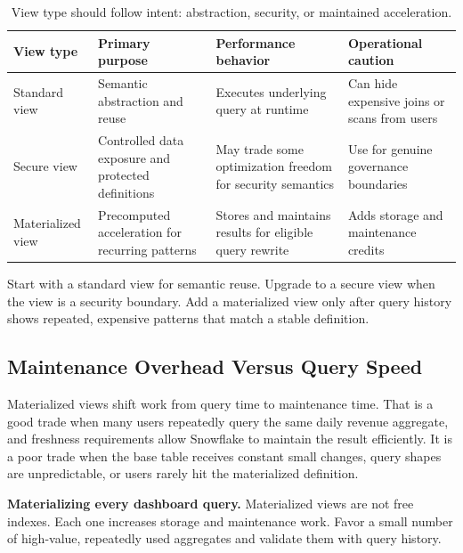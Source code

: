 \begin{table}[H]
\centering
\small
\begin{tabular}{@{}p{2.7cm}p{3.6cm}p{3.9cm}p{3.3cm}@{}}
\toprule
\textbf{View type} & \textbf{Primary purpose} & \textbf{Performance behavior} & \textbf{Operational caution} \\
\midrule
Standard view & Semantic abstraction and reuse & Executes underlying query at runtime & Can hide expensive joins or scans from users \\
Secure view & Controlled data exposure and protected definitions & May trade some optimization freedom for security semantics & Use for genuine governance boundaries \\
Materialized view & Precomputed acceleration for recurring patterns & Stores and maintains results for eligible query rewrite & Adds storage and maintenance credits \\
\bottomrule
\end{tabular}
\caption{View type should follow intent: abstraction, security, or maintained acceleration.}
\label{tab:chapter3-view-types}
\end{table}
\begin{tipbox}
Start with a standard view for semantic reuse. Upgrade to a secure view when the view is a security boundary. Add a materialized view only after query history shows repeated, expensive patterns that match a stable definition.
\end{tipbox}
\subsection{Maintenance Overhead Versus Query Speed}
Materialized views shift work from query time to maintenance time. That is a good trade when many users repeatedly query the same daily revenue aggregate, and freshness requirements allow Snowflake to maintain the result efficiently. It is a poor trade when the base table receives constant small changes, query shapes are unpredictable, or users rarely hit the materialized definition.
\begin{pitfall}
\textbf{Materializing every dashboard query.} Materialized views are not free indexes. Each one increases storage and maintenance work. Favor a small number of high-value, repeatedly used aggregates and validate them with query history.
\end{pitfall}
